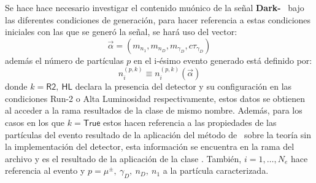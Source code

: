 
Se hace hace necesario investigar el contenido muónico de la señal \textbf{Dark-}\SUSY~ bajo las diferentes condiciones de generación, para hacer referencia a estas condiciones iniciales con las que se generó la señal, se hará uso del vector:
\begin{equation}
\vec{\alpha} = (m_{n_1}, m_{n_D}, m_{\gamma_D}, c\tau_{\gamma_D})
\end{equation}
además el número de partículas $p$ en el i-ésimo evento generado está definido por:
\begin{equation}\label{numero_particulas}
n_i^{(p,k)} \equiv n_i^{(p,k)} (\vec{\alpha})
\end{equation}
donde 
$k =\textsf{R2},~\textsf{HL}$ declara la presencia del detector y su configuración en las condiciones Run-2 o Alta Luminosidad respectivamente, estos datos se obtienen al acceder a la rama  resultados de la clase de mismo nombre. Además, para los casos en los que $k=\textsf{True}$ estos hacen referencia a las propiedades de las partículas del evento resultado de la aplicación del método de \MC ~sobre la teoría sin la implementación del detector, esta información se encuentra en la rama  del archivo  y es el resultado de la aplicación de la clase . También, $i = 1, \ldots, N_{e}$ hace referencia al evento y $p = \mu^\pm, ~ \gamma_D, ~n_D, ~n_1$ a la partícula caracterizada.

